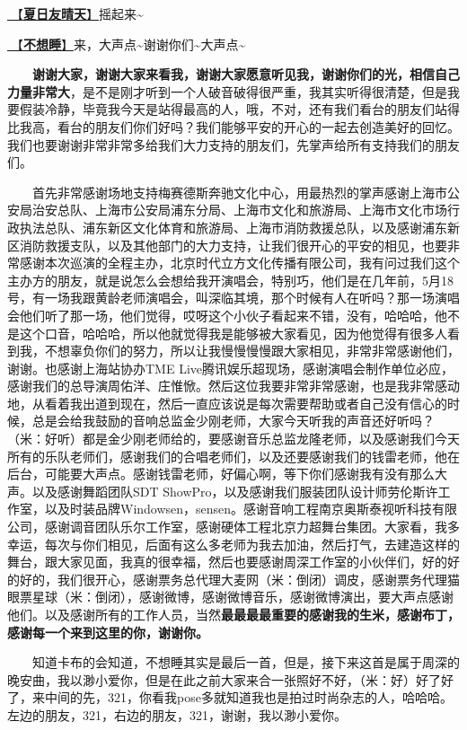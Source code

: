 \documentclass[]{ctexbook}
\begin{document}
\hyperref[sunny-day-in-summer]{🎵【\textbf{夏日友晴天}】}摇起来\textasciitilde{}

\hyperref[keep-playing]{🎵【\textbf{不想睡}】}来，大声点\textasciitilde 谢谢你们\textasciitilde 大声点\textasciitilde{}

  \textbf{谢谢大家，谢谢大家来看我，谢谢大家愿意听见我，谢谢你们的光，相信自己力量非常大}，是不是刚才听到一个人破音破得很严重，我其实听得很清楚，但是我要假装冷静，毕竟我今天是站得最高的人，哦，不对，还有我们看台的朋友们站得比我高，看台的朋友们你们好吗？我们能够平安的开心的一起去创造美好的回忆。我们也要谢谢非常非常多给我们大力支持的朋友们，先掌声给所有支持我们的朋友们。

  首先非常感谢场地支持梅赛德斯奔驰文化中心，用最热烈的掌声感谢上海市公安局治安总队、上海市公安局浦东分局、上海市文化和旅游局、上海市文化市场行政执法总队、浦东新区文化体育和旅游局、上海市消防救援总队，以及感谢浦东新区消防救援支队，以及其他部门的大力支持，让我们很开心的平安的相见，也要非常感谢本次巡演的全程主办，北京时代立方文化传播有限公司，我有问过我们这个主办方的朋友，就是说怎么会想给我开演唱会，特别巧，他们是在几年前，5月18号，有一场我跟黄龄老师演唱会，叫深临其境，那个时候有人在听吗？那一场演唱会他们听了那一场，他们觉得，哎呀这个小伙子看起来不错，没有，哈哈哈，他不是这个口音，哈哈哈，所以他就觉得我是能够被大家看见，因为他觉得有很多人看到我，不想辜负你们的努力，所以让我慢慢慢慢跟大家相见，非常非常感谢他们，谢谢。也感谢上海站协办TME Live腾讯娱乐超现场，感谢演唱会制作单位必应，感谢我们的总导演周佑洋、庄惟惞。然后这位我要非常非常感谢，也是我非常感动地，从看着我出道到现在，然后一直应该说是每次需要帮助或者自己没有信心的时候，总是会给我鼓励的音响总监金少刚老师，大家今天听我的声音还好听吗？（米：好听）都是金少刚老师给的，要感谢音乐总监龙隆老师，以及感谢我们今天所有的乐队老师们，感谢我们的合唱老师们，以及还要感谢我们的钱雷老师，他在后台，可能要大声点。感谢钱雷老师，好偏心啊，等下你们感谢我有没有那么大声。以及感谢舞蹈团队SDT ShowPro，以及感谢我们服装团队设计师劳伦斯许工作室，以及时装品牌Windowsen，sensen。感谢音响工程南京奥斯泰视听科技有限公司，感谢调音团队乐尔工作室，感谢硬体工程北京力超舞台集团。大家看，我多幸运，每次与你们相见，后面有这么多老师为我去加油，然后打气，去建造这样的舞台，跟大家见面，我真的很幸福，然后也要感谢周深工作室的小伙伴们，好的好的好的，我们很开心，感谢票务总代理大麦网（米：倒闭）调皮，感谢票务代理猫眼票星球（米：倒闭），感谢微博，感谢微博音乐，感谢微博演出，要大声点感谢他们。以及感谢所有的工作人员，当然\textbf{最最最最重要的感谢我的生米，感谢布丁，感谢每一个来到这里的你，谢谢你。}

  知道卡布的会知道，不想睡其实是最后一首，但是，接下来这首是属于周深的晚安曲，我以渺小爱你，但是在此之前大家来合一张照好不好，（米：好）好了好了，来中间的先，321，你看我pose多就知道我也是拍过时尚杂志的人，哈哈哈。左边的朋友，321，右边的朋友，321，谢谢，我以渺小爱你。
\end{document}
